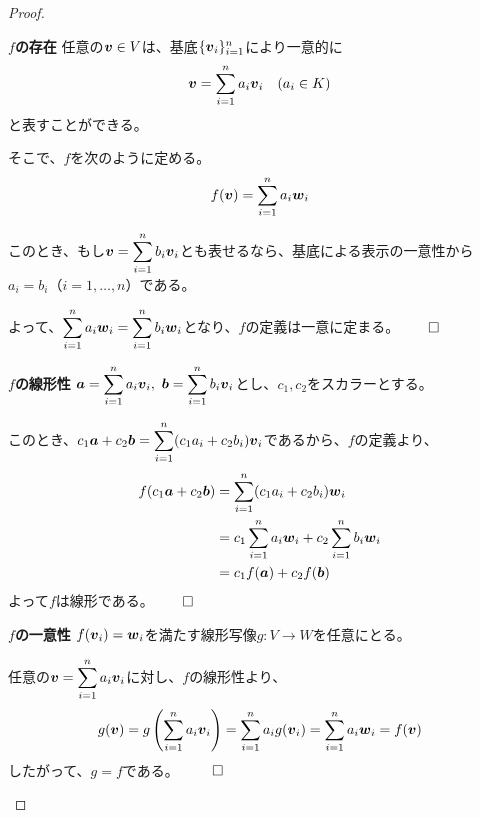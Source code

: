 \documentclass[../../../topic_linear-algebra]{subfiles}
\begin{document}
\begin{proof}
  \begin{subpattern}{\bfseries $f$の存在}
    任意の$\vb*{v}\in V$は、基底$\{\vb*{v}_i\}_{i=1}^n$により一意的に
    \begin{equation*}
      \vb*{v} = \sum_{i=1}^n a_i \vb*{v}_i \quad (a_i \in K)
    \end{equation*}
    と表すことができる。
    
    そこで、$f$を次のように定める。
    \begin{equation*}
      f(\vb*{v}) = \sum_{i=1}^n a_i\vb*{w}_i
    \end{equation*}
    
    このとき、もし$\vb*{v}=\displaystyle\sum_{i=1}^n b_i\vb*{v}_i$とも表せるなら、基底による表示の一意性から$a_i=b_i$（$i=1,\dots,n$）である。
    
    よって、$\displaystyle\sum_{i=1}^n a_i\vb*{w}_i=\sum_{i=1}^n b_i\vb*{w}_i$となり、$f$の定義は一意に定まる。$\qed$
  \end{subpattern}
  
  \begin{subpattern}{\bfseries $f$の線形性}
    $\displaystyle\vb*{a}=\sum_{i=1}^n a_i\vb*{v}_i,\ \vb*{b}=\sum_{i=1}^n b_i\vb*{v}_i$とし、$c_1,c_2$をスカラーとする。

    このとき、$\displaystyle c_1\vb*{a}+c_2\vb*{b}=\sum_{i=1}^n(c_1 a_i+c_2 b_i)\vb*{v}_i$であるから、$f$の定義より、
    \begin{align*}
      f(c_1\vb*{a}+c_2\vb*{b})
        &= \sum_{i=1}^n(c_1 a_i+c_2 b_i)\vb*{w}_i \\
        &= c_1\sum_{i=1}^n a_i\vb*{w}_i + c_2\sum_{i=1}^n b_i\vb*{w}_i \\
        &= c_1 f(\vb*{a})+c_2 f(\vb*{b})
    \end{align*}
    よって$f$は線形である。$\qed$
  \end{subpattern}
  
  \begin{subpattern}{\bfseries $f$の一意性}
    $f(\vb*{v}_i)=\vb*{w}_i$を満たす線形写像$g\colon V\to W$を任意にとる。
    
    任意の$\displaystyle\vb*{v}=\sum_{i=1}^n a_i\vb*{v}_i$に対し、$f$の線形性より、
    \begin{equation*}
      g(\vb*{v}) = g\left(\sum_{i=1}^n a_i\vb*{v}_i\right)
      = \sum_{i=1}^n a_i g(\vb*{v}_i)
      = \sum_{i=1}^n a_i\vb*{w}_i
      = f(\vb*{v})
    \end{equation*}
    したがって、$g=f$である。 $\qed$
  \end{subpattern}
\end{proof}
\end{document}
